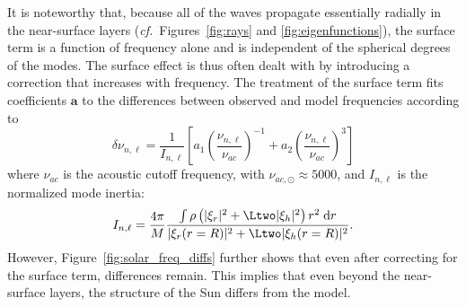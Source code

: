 It is noteworthy that, because all of the waves propagate essentially radially in the near-surface layers (\emph{cf.}~Figures~\ref{fig:rays} and \ref{fig:eigenfunctions}), the surface term is a function of frequency alone and is independent of the spherical degrees of the modes. 
The surface effect is thus often dealt with by introducing a correction that increases with frequency. %
The \citet{2014A&A...568A.123B} treatment of the surface term fits coefficients $\mathbf a$ to the differences between observed and model frequencies according to
\begin{equation} \label{eq:BallGizon-surfterm}
    \delta \nu_{n,\ell} 
    = 
    \frac{1}{I_{n,\ell}} \left[ 
        a_1 \left( 
            \frac{\nu_{n,\ell}}{\nu_{ac}} 
        \right)^{-1} 
        + 
        a_2 \left( 
            \frac{\nu_{n,\ell}}{\nu_{ac}} 
        \right)^{3} 
    \right] %
\end{equation}
where $\nu_{ac}$ is the acoustic cutoff frequency, with ${\nu_{ac,\odot} \approx 5000}$, and $I_{n,\ell}$ is the normalized mode inertia:
\begin{equation} \label{eq:normalized-mode-inertia}
    I_{n,\ell}
    =
    \frac{4\pi}{M}
    \frac{\int \rho
            \left(
                |\xi_r|^2
                +
                \Ltwo |\xi_h|^2
            \right) 
            r^2
        \;\text{d}r}{
            |\xi_r(r=R)|^2
            +
            \Ltwo
            |\xi_h(r=R)|^2
        }.
\end{equation}
However, Figure~\ref{fig:solar_freq_diffs} further shows that even after correcting for the surface term, differences remain. 
This implies that even beyond the near-surface layers, the structure of the Sun differs from the model. 

